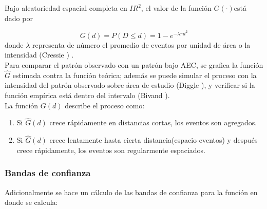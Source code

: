 \documentclass[12pt]{report}
\begin{document}
		
		Bajo aleatoriedad espacial completa en ${I\!R}^{2}$, el valor de la función $G(\cdot)$está dado por
		
		\[ G(d) = P (D \leq d) = 1 -e^{- \lambda \pi d^2 } \]  donde $\lambda $  representa de número el promedio de eventos por unidad de área o la intensidad  (Cressie \cite{Cress}) .\\
		
		
		
		
		
		Para comparar el patrón observado con un patrón bajo AEC, se grafica la función $\widehat{G}$ estimada  contra la función teórica; además se puede simular el proceso con la intensidad del patrón observado sobre área de estudio (Diggle \cite{Diggle}), y verificar si la función empírica está dentro del intervalo (Bivand  \cite{Roger}).\\
		
		
		La función $G(d)$  describe el proceso como: 
		
		\begin{enumerate}[$\bullet$]
			
			\item  Si $\widehat{G}(d)$ crece rápidamente en distancias cortas, los eventos son agregados.
			
			\item  Si  $\widehat{G}(d)$ crece lentamente hasta cierta distancia(espacio eventos) y después crece rápidamente, los eventos son regularmente espaciados.
			
		\end{enumerate}
		
		\subsubsection{Bandas de confianza}
		Adicionalmente se hace un cálculo de las bandas de confianza  para la función en donde se
		calcula:
		
\end{document}
